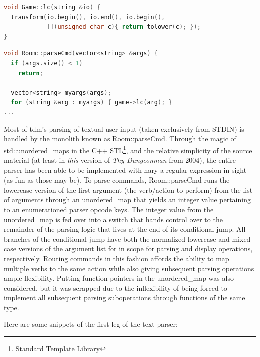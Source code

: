\documentclass[man,12pt]{apa6}
\begin{document}
\begin{framed}
\begin{lstlisting}[language=C++]
void Game::lc(string &io) {
  transform(io.begin(), io.end(), io.begin(),
            [](unsigned char c){ return tolower(c); });
}
\end{lstlisting}
\end{framed}

\begin{framed}
\begin{lstlisting}[language=C++]
void Room::parseCmd(vector<string> &args) {
  if (args.size() < 1)
    return;

  vector<string> myargs(args);
  for (string &arg : myargs) { game->lc(arg); }
...
\end{lstlisting}
\end{framed}


Most of \textsf{tdm}'s parsing of textual user input (taken exclusively from
\textsf{STDIN}) is handled by the monolith known as \textsf{Room::parseCmd}.
Through the magic of \textsf{std::unordered\_map}s in the C++
STL\footnote{Standard Template Library},
and the relative simplicity of the source material (at least in \emph{this}
version of \emph{Thy Dungeonman} from 2004), the entire parser has been
able to be implemented with nary a regular expression in sight (as fun as those
may
be).  To parse commands, \textsf{Room::parseCmd} runs the lowercase version of
the first argument (the verb/action to perform) from the list of arguments
through an \textsf{unordered\_map} that yields an integer value pertaining to
an \textsf{enum}erationed parser opcode keys.  The integer value from
the \textsf{unordered\_map} is fed over into a switch that hands control over
to the remainder of the parsing logic that lives at the end of its conditional
jump.  All branches of the conditional jump have both the normalized lowercase
and mixed-case versions of the argument list for in scope for parsing and
display operations, respectively.  Routing commands in this fashion affords
the ability to map multiple
verbs to the same action while also giving subsequent parsing operations ample
flexibility.  Putting function pointers in the \textsf{unordered\_map} was also
considered, but it was scrapped due to the inflexibility of being forced to
implement all subsequent parsing suboperations through functions of the same
type.

Here are some snippets of the first leg of the text parser:
\end{document}
